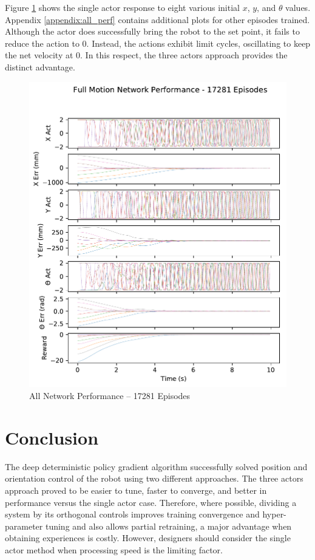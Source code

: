 Figure \ref{fig:all_perf} shows the single actor response to eight various initial $x$, $y$, and $\theta$ values. Appendix \ref{appendix:all_perf} contains additional plots for other episodes trained. Although the actor does successfully bring the robot to the set point, it fails to reduce the action to 0. Instead, the actions exhibit limit cycles, oscillating to keep the net velocity at 0. In this respect, the three actors approach provides the distinct advantage.
\begin{figure}[H]
	\centering
	\includegraphics[width=6in, keepaspectratio]{figures/train_figs/all_transitions/3_17281.pdf}
	\caption{All Network Performance -- 17281 Episodes}\label{fig:all_perf}
\end{figure}

\section{Conclusion}
The deep deterministic policy gradient algorithm successfully solved position and orientation control of the robot using two different approaches. The three actors approach proved to be easier to tune, faster to converge, and better in performance versus the single actor case. Therefore, where possible, dividing a system by its orthogonal controls improves training convergence and hyper-parameter tuning and also allows partial retraining, a major advantage when obtaining experiences is costly. However, designers should consider the single actor method when processing speed is the limiting factor.

